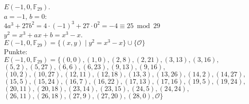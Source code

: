 \documentclass[a4paper, 10pt]{scrartcl}
\begin{document}
$E(-1, 0, \mathbb{F}_{29})$.\\

$a = -1$, $b = 0$:\\
$4a^{3} + 27b^{2} = 4\cdot (-1)^{3} + 27\cdot 0^{2} = -4 \equiv 25\bmod 29$\\
$y^{2} = x^{3} + ax + b = x^{3} - x$.\\

$E(-1, 0, \mathbb{F}_{29}) = \{ (x, y)\mid y^{2} = x^{3} - x \}\cup \{ \mathcal{O} \}$\\

Punkte:\\
$
E(-1, 0, \mathbb{F}_{29}) = \{
(0, 0),
(1, 0),
(2, 8),
(2, 21),
(3, 13),
(3, 16),
$\\
$
(5, 2),
(5, 27),
(6, 6),
(6, 23),
(9, 13),
(9, 16),
$\\
$
(10, 2),
(10, 27),
(12, 11),
(12, 18),
(13, 3),
(13, 26),
(14, 2),
(14, 27),
$\\
$
(15, 5),
(15, 24),
(16, 7),
(16, 22),
(17, 13),
(17, 16),
(19, 5),
(19, 24),
$\\
$
(20, 11),
(20, 18),
(23, 14),
(23, 15),
(24, 5),
(24, 24),
$\\
$
(26, 11),
(26, 18),
(27, 9),
(27, 20),
(28, 0),
\mathcal{O} \}
$\\
\end{document}
